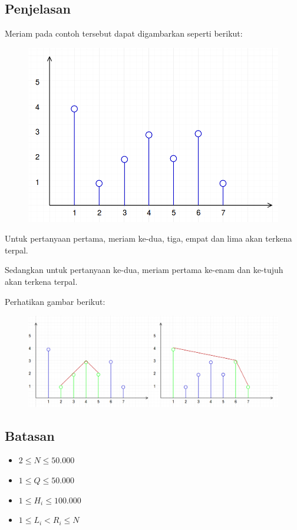 \documentclass{article}
\begin{document}
\subsection*{Penjelasan}

\par\noindent Meriam pada contoh tersebut dapat digambarkan seperti berikut:

\begin{figure}[h!]
	\centering
	\includegraphics[width=0.4\linewidth]{meriam_sample1.png}
\end{figure}

\par\noindent Untuk pertanyaan pertama, meriam ke-dua, tiga, empat dan lima akan terkena terpal.
\par\noindent Sedangkan untuk pertanyaan ke-dua, meriam pertama ke-enam dan ke-tujuh akan terkena terpal.
\par\noindent Perhatikan gambar berikut:

\begin{figure}[h!]
	\centering
	\includegraphics[width=0.7\linewidth]{meriam_sample2.png}
\end{figure}

\subsection*{Batasan}

\begin{itemize}
	\item $2 \leq N \leq 50.000$
	\item $1 \leq Q \leq 50.000$
	\item $1 \leq H_i \leq 100.000$
	\item $1 \leq L_i < R_i \leq N$
\end{itemize}
\end{document}
